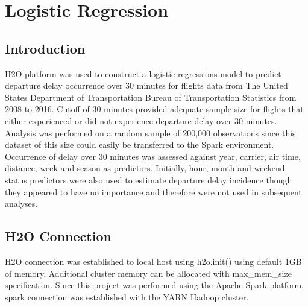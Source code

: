 \documentclass[12pt,twoside]{amherstthesis}
\begin{document}
  \clearpage
  
  \chapter{Logistic Regression}\label{logistic-regression}
  
  \section{Introduction}\label{introduction-2}
  
  H2O platform was used to construct a logistic regressions model to
  predict departure delay occurrence over 30 minutes for flights data from
  The United States Department of Transportation Bureau of Transportation
  Statistics from 2008 to 2016. Cutoff of 30 minutes provided adequate
  sample size for flights that either experienced or did not experience
  departure delay over 30 minutes. Analysis was performed on a random
  sample of 200,000 observations since this dataset of this size could
  easily be transferred to the Spark environment. Occurrence of delay over
  30 minutes was assessed against year, carrier, air time, distance, week
  and season as predictors. Initially, hour, month and weekend status
  predictors were also used to estimate departure delay incidence though
  they appeared to have no importance and therefore were not used in
  subsequent analyses.
  
  \section{H2O Connection}\label{h2o-connection}
  
  H2O connection was established to local host using h2o.init() using
  default 1GB of memory. Additional cluster memory can be allocated with
  max\_mem\_size specification. Since this project was performed using the
  Apache Spark platform, spark connection was established with the YARN
  Hadoop cluster.
  
  \begin{Shaded}
  \begin{Highlighting}[]
  \NormalTok{(} \NormalTok{)}
  
  \NormalTok{()}
  
  \NormalTok{()}
  
  \StringTok{ }\NormalTok{(} \NormalTok{)}
  \end{Highlighting}
  \end{Shaded}
  
\end{document}
